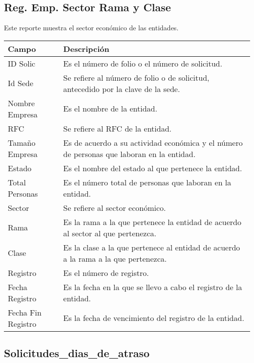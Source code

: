 \subsection{Reg. Emp. Sector Rama y Clase}
\label{appendix:Reportes:PeopleSoft:RegEmpSectorRamaClase}

Este reporte muestra el sector económico de las entidades.\\

\begin{tabular}{ m{} m{}  }%
	\rowcolor{gray1} {\bf Campo} &  {\bf Descripción} \\ \hline \hline

	ID Solic & Es el número de folio o el número de solicitud.\\
	\rowcolor{gray1}Id Sede & Se refiere al número de folio o de solicitud, antecedido por la clave de la sede.\\
	Nombre Empresa & Es el nombre de la entidad.\\
	\rowcolor{gray1}RFC & Se refiere al RFC de la entidad.\\
	Tamaño Empresa& Es de acuerdo a su actividad económica y el número de personas que laboran en la entidad.\\
	\rowcolor{gray1}Estado & Es el nombre del estado al que pertenece la entidad.\\
	Total Personas & Es el número total de personas que laboran en la entidad.\\
	\rowcolor{gray1}Sector & Se refiere al sector económico.\\
	Rama & Es la rama a la que pertenece la entidad de acuerdo al sector al que pertenezca.\\
	\rowcolor{gray1}Clase & Es la clase a la que pertenece al entidad de acuerdo a la rama a la que pertenezca.\\
	Registro & Es el número de registro.\\
	\rowcolor{gray1}Fecha Registro & Es la fecha en la que se llevo a cabo el registro de la entidad.\\
	Fecha Fin Registro & Es la fecha de vencimiento del registro de la entidad.\\
\end{tabular}

\newpage
\subsection{Solicitudes\_dias\_de\_atraso}
\label{appendix:Reportes:PeopleSoft:SolicitudesDiasAtraso}

